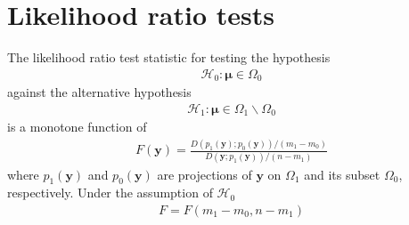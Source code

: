 \section{Likelihood ratio tests}

\begin{theorem}
The likelihood ratio test statistic for testing the hypothesis
\begin{align}
\mathcal{H}_0:\boldsymbol{\mu} \in \Omega_0
\end{align}
against the alternative hypothesis
\begin{align}
\mathcal{H}_1:\boldsymbol{\mu} \in \Omega_1 \backslash \Omega_0
\end{align}
is a monotone function of 
\begin{align}
F(\boldsymbol{y})=\frac{D(p_1(\boldsymbol{y});p_0(\boldsymbol{y}))/(m_1-m_0)}{D(\boldsymbol{y};p_1(\boldsymbol{y}))/(n-m_1)}
\end{align}
where $p_1(\boldsymbol{y})$ and $p_0(\boldsymbol{y})$ are projections of $\boldsymbol{y}$ on $\Omega_1$ and its subset $\Omega_0$, respectively.
Under the assumption of $\mathcal{H}_0$ 
\begin{align}
F = F(m_1-m_0,n-m_1)
\end{align}
\end{theorem}